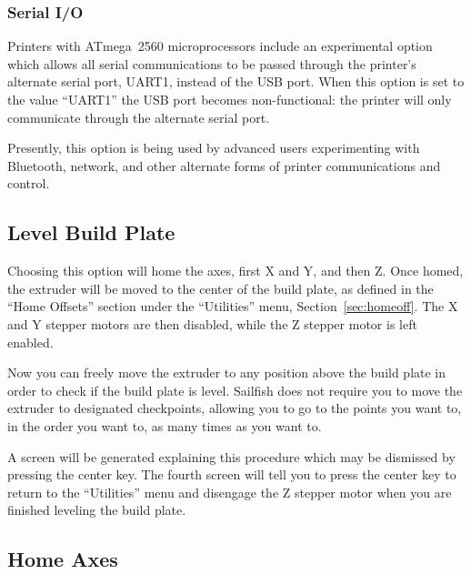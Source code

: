 
\subsubsection{Serial I/O} \label{sec:alternate-uart}

Printers with ATmega~2560 microprocessors include an experimental option which allows all serial communications to be passed through the printer's alternate serial port, UART1, instead of the USB port.  When this option is set to the value ``UART1'' the USB port becomes non-functional: the printer will only communicate through the alternate serial port.

Presently, this option is being used by advanced users experimenting with Bluetooth, network, and other alternate forms of printer communications and control.  


\subsection{Level Build Plate} \label{sec:levelbp}

Choosing this option will home the axes, first X and Y, and then Z.  Once homed, the extruder will be moved to the center of the build plate, as defined in the ``Home Offsets'' section under the ``Utilities'' menu, Section~\ref{sec:homeoff}.  The X and Y stepper motors are then disabled, while the Z stepper motor is left enabled.

Now you can freely move the extruder to any position above the build plate in order to check if the build plate is level.  Sailfish does not require you to move the extruder to designated checkpoints, allowing you to go to the points you want to, in the order you want to, as many times as you want to.  

A screen will be generated explaining this procedure which may be dismissed by pressing the center key.  The fourth screen will tell you to press the center key to return to the ``Utilities'' menu and disengage the Z stepper motor when you are finished leveling the build plate.


\subsection{Home Axes} \label{sec:home-axes}


